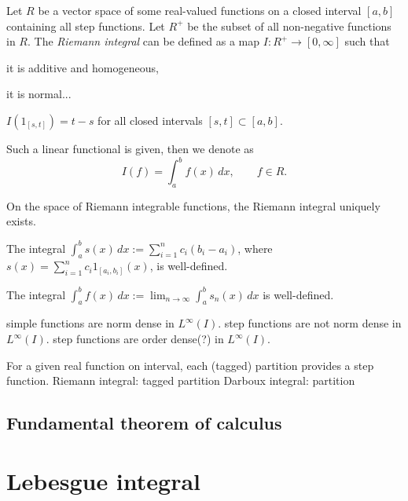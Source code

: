\documentclass{../../large}
\begin{document}
\begin{prb}
Let $R$ be a vector space of some real-valued functions on a closed interval $[a,b]$ containing all step functions.
Let $R^+$ be the subset of all non-negative functions in $R$.
The \emph{Riemann integral} can be defined as a map $I:R^+\to[0,\infty]$ such that
\begin{parts}
\item it is additive and homogeneous,
\item it is normal...
\item $I(1_{[s,t]})=t-s$ for all closed intervals $[s,t]\subset[a,b]$.
\end{parts}
Such a linear functional is given, then we denote as
\[I(f)=\int_a^bf(x)\,dx,\qquad f\in R.\]

On the space of Riemann integrable functions, the Riemann integral uniquely exists.

\begin{parts}
\item The integral $\int_a^bs(x)\,dx:=\sum_{i=1}^nc_i(b_i-a_i)$, where $s(x)=\sum_{i=1}^nc_i1_{[a_i,b_i]}(x)$, is well-defined.
\item The integral $\int_a^bf(x)\,dx:=\lim_{n\to\infty}\int_a^bs_n(x)\,dx$ is well-defined.
\end{parts}
\end{prb}
\begin{pf}
\end{pf}


simple functions are norm dense in $L^\infty(I)$.
step functions are not norm dense in $L^\infty(I)$.
step functions are order dense(?) in $L^\infty(I)$.




For a given real function on interval, each (tagged) partition provides a step function.
Riemann integral: tagged partition
Darboux integral: partition

\section{Fundamental theorem of calculus}



\chapter{Lebesgue integral}
\end{document}
